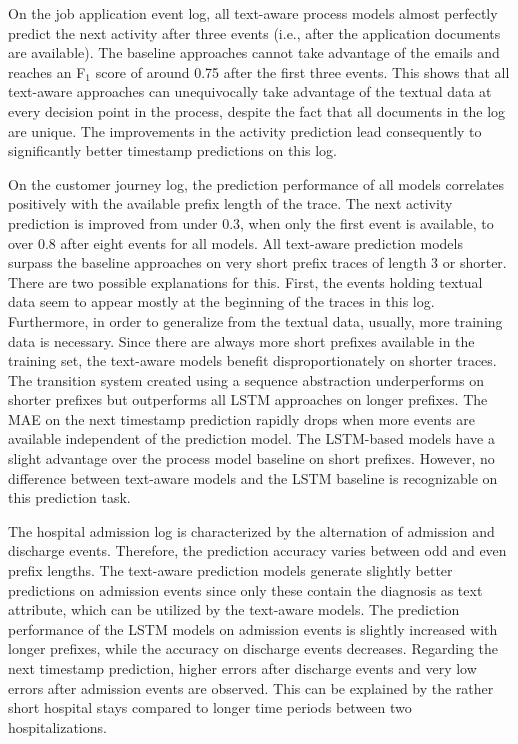 On the job application event log, all text-aware process models almost perfectly predict the next activity after three events (i.e., after the application documents are available).
The baseline approaches cannot take advantage of the emails and reaches an F$_1$ score of around 0.75 after the first three events.
This shows that all text-aware approaches can unequivocally take advantage of the textual data at every decision point in the process, despite the fact that all documents in the log are unique.
The improvements in the activity prediction lead consequently to significantly better timestamp predictions on this log.

On the customer journey log, the prediction performance of all models correlates positively with the available prefix length of the trace.
The next activity prediction is improved from under 0.3, when only the first event is available, to over 0.8 after eight events for all models.
All text-aware prediction models surpass the baseline approaches on very short prefix traces of length 3 or shorter.
There are two possible explanations for this.
First, the events holding textual data seem to appear mostly at the beginning of the traces in this log.
Furthermore, in order to generalize from the textual data, usually, more training data is necessary.
Since there are always more short prefixes available in the training set, the text-aware models benefit disproportionately on shorter traces.
The transition system created using a sequence abstraction underperforms on shorter prefixes but outperforms all LSTM approaches on longer prefixes.
The MAE on the next timestamp prediction rapidly drops when more events are available independent of the prediction model.
The LSTM-based models have a slight advantage over the process model baseline on short prefixes.
However, no difference between text-aware models and the LSTM baseline is recognizable on this prediction task.

The hospital admission log is characterized by the alternation of admission and discharge events.
Therefore, the prediction accuracy varies between odd and even prefix lengths.
The text-aware prediction models generate slightly better predictions on admission events since only these contain the diagnosis as text attribute, which can be utilized by the text-aware models.
The prediction performance of the LSTM models on admission events is slightly increased with longer prefixes, while the accuracy on discharge events decreases.
Regarding the next timestamp prediction, higher errors after discharge events and very low errors after admission events are observed.
This can be explained by the rather short hospital stays compared to longer time periods between two hospitalizations.

